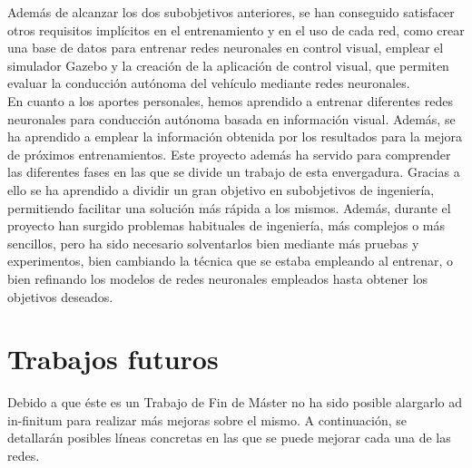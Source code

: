 Además de alcanzar los dos subobjetivos anteriores, se han conseguido satisfacer otros requisitos implícitos en el entrenamiento y en el uso de cada red, como crear una base de datos para entrenar redes neuronales en control visual, emplear el simulador Gazebo y la creación de la aplicación de control visual, que permiten evaluar la conducción autónoma del vehículo mediante redes neuronales.\\

En cuanto a los aportes personales, hemos aprendido a entrenar diferentes redes neuronales para conducción autónoma basada en información visual. Además, se ha aprendido a emplear la información obtenida por los resultados para la mejora de próximos entrenamientos. Este proyecto además ha servido para comprender las diferentes fases en las que se divide un trabajo de esta envergadura. Gracias a ello se ha aprendido a dividir un gran objetivo en subobjetivos de ingeniería, permitiendo facilitar una solución más rápida a los mismos. Además, durante el proyecto han surgido problemas habituales de ingeniería, más complejos o más sencillos, pero ha sido necesario solventarlos bien mediante más pruebas y experimentos, bien cambiando la técnica que se estaba empleando al entrenar, o bien refinando los modelos de redes neuronales empleados hasta obtener los objetivos deseados.\\


\section{Trabajos futuros}

Debido a que éste es un Trabajo de Fin de Máster no ha sido posible alargarlo ad in-finitum para realizar más mejoras sobre el mismo. A continuación, se detallarán posibles líneas concretas en las que se puede mejorar cada una de las redes.\\

